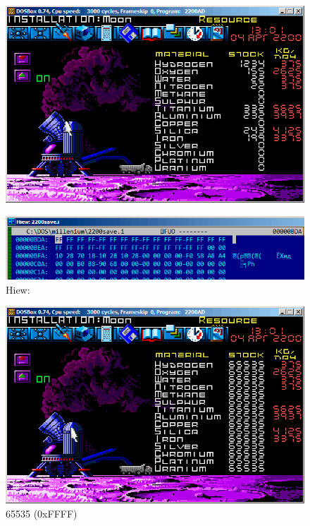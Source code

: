 \begin{figure}[H]
\centering
\includegraphics[scale=\FigScale]{ff/millenium/5.png}
\caption{}
\label{fig:mill_5}
\end{figure}

\begin{figure}[H]
\centering
\includegraphics[scale=\FigScale]{ff/millenium/hiew7.png}
\caption{Hiew: }
\label{fig:mill_hiew7}
\end{figure}

\begin{figure}[H]
\centering
\includegraphics[scale=\FigScale]{ff/millenium/6.png}
\caption{ 65535 (0xFFFF)}
\label{fig:mill_6}
\end{figure}

